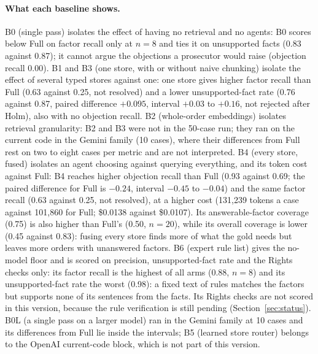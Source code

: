 \paragraph{What each baseline shows.} B0 (single pass) isolates the effect of having no retrieval and no agents: B0 scores below Full on factor recall only at $n=8$ and ties it on unsupported facts (0.83 against 0.87); it cannot argue the objections a prosecutor would raise (objection recall 0.00). B1 and B3 (one store, with or without naive chunking) isolate the effect of several typed stores against one: one store gives higher factor recall than Full (0.63 against 0.25, not resolved) and a lower unsupported-fact rate (0.76 against 0.87, paired difference $+0.095$, interval $+0.03$ to $+0.16$, not rejected after Holm), also with no objection recall. B2 (whole-order embeddings) isolates retrieval granularity: B2 and B3 were not in the 50-case run; they ran on the current code in the Gemini family (10 cases), where their differences from Full rest on two to eight cases per metric and are not interpreted. B4 (every store, fused) isolates an agent choosing against querying everything, and its token cost against Full: B4 reaches higher objection recall than Full (0.93 against 0.69; the paired difference for Full is $-0.24$, interval $-0.45$ to $-0.04$) and the same factor recall (0.63 against 0.25, not resolved), at a higher cost (131,239 tokens a case against 101,860 for Full; \$0.0138 against \$0.0107). Its answerable-factor coverage (0.75) is also higher than Full's (0.50, $n=20$), while its overall coverage is lower (0.45 against 0.83): fusing every store finds more of what the gold needs but leaves more orders with unanswered factors. B6 (expert rule list) gives the no-model floor and is scored on precision, unsupported-fact rate and the Rights checks only: its factor recall is the highest of all arms (0.88, $n=8$) and its unsupported-fact rate the worst (0.98): a fixed text of rules matches the factors but supports none of its sentences from the facts. Its Rights checks are not scored in this version, because the rule verification is still pending (Section~\ref{sec:status}). B0L (a single pass on a larger model) ran in the Gemini family at 10 cases and its differences from Full lie inside the intervals; B5 (learned store router) belongs to the OpenAI current-code block, which is not part of this version.


